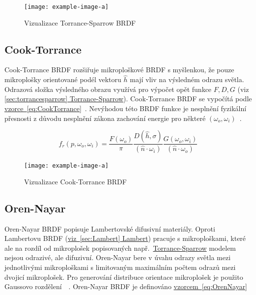 \documentclass[czech,master]{diploma}
\newcommand{\uvec}[1]{\hat{#1}}
\newcommand{\point}{p}
\newcommand{\brdf}{f_r\left(\point,\omega_{o},\omega_{i}\right)}
\newcommand{\normVec}{\uvec{n}}
\newcommand{\inVec}{\omega_{i}}
\newcommand{\outVec}{\omega_{o}}
\newcommand{\halfVec}{\uvec{h}}
\newcommand{\rough}{\sigma}
\begin{document}
\begin{figure}[ht]%
  \centering\texttt{[image: example-image-a]}%
  \caption{Vizualizace Torrance-Sparrow BRDF}%
  \label{fig:torranceSparrowBRDFRender}%
\end{figure}

\subsection{Cook-Torrance}
Cook-Torrance BRDF rozšiřuje mikroploškové BRDF s myšlenkou, že pouze mikroplošky orientované podél vektoru \(\halfVec\) mají vliv na výsledném odrazu světla. Odrazová složka výsledného obrazu využívá pro výpočet opět funkce \(F, D, G\) (viz \hyperref[sec:torrancesparrow]{\ref{sec:torrancesparrow} Torrance-Sparrow}). Cook-Torrance BRDF se vypočítá podle \hyperref[eq:CookTorrance]{vzorce~\ref{eq:CookTorrance}}~\cite{CookTorranceBRDF}. Nevýhodou této BRDF funkce je nesplnění fyzikální přesnosti z důvodu nesplnění zákona zachování energie pro některé \(\left(\outVec,\inVec\right)\)~\cite{BRDFOverview}.

\begin{equation} \label{eq:CookTorrance}
  \brdf  = \frac{F(\outVec)}{\pi} \frac{D(\halfVec,\rough)}{(\normVec\cdot\inVec)} \frac{G(\outVec,\inVec)}{(\normVec\cdot\outVec)}
\end{equation}


\begin{figure}[ht]%
  \centering\texttt{[image: example-image-a]}%
  \caption{Vizualizace Cook-Torrance BRDF}%
  \label{fig:cookTorranceBRDFRender}%
\end{figure}

\subsection{Oren-Nayar}
Oren-Nayar BRDF popisuje Lambertovské difusivní materiály. Oproti Lambertovu BRDF (\hyperref[sec:Lambert]{viz~\ref{sec:Lambert} Lambert}) pracuje s mikroploškami, které ale na rozdíl od mikroplošek popisovaných např.\ \hyperref[sec:torrancesparrow]{Torrance-Sparrow} modelem nejsou odrazivé, ale difuzivní. Oren-Nayar bere v úvahu odrazy světla mezi jednotlivými mikroploškami s limitovaným maximálním počtem odrazů mezi dvojicí mikroplošek. Pro generování distribuce orientace mikroplošek je použito Gaussovo rozdělení~\cite{OrenNayar}~\cite{BRDFOverview}. Oren-Nayar BRDF je definováno \hyperref[eq:OrenNayar]{vzorcem~\ref{eq:OrenNayar}}

\newcommand{\cosphiri}{\cos\left(\phi_r-\phi_i\right)}
\end{document}
